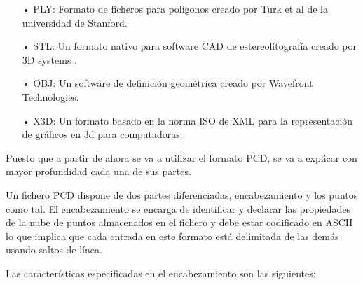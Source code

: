 \begin{itemize}
\item[•]PLY: Formato de ficheros para polígonos creado por Turk et al de la universidad de Stanford.
\item[•]STL: Un formato nativo para software CAD de estereolitografía creado por 3D systems .

\item[•]OBJ: Un software de definición geométrica creado por Wavefront Technologies.

\item[•]X3D: Un formato basado en la norma ISO de XML para la representación de gráficos en 3d para computadoras.
\end{itemize}
 
Puesto que a partir de ahora se va a utilizar el formato PCD\cite{pcd_format}, se va a explicar con mayor profundidad cada una de sus partes.

Un fichero PCD dispone de dos partes diferenciadas, encabezamiento y los puntos como tal. El encabezamiento se encarga de identificar y declarar las propiedades de la nube de puntos almacenados en el fichero y debe estar codificado en ASCII lo que implica que cada entrada en este formato está delimitada de las demás usando saltos de línea.

Las características especificadas en el encabezamiento son las siguientes:

